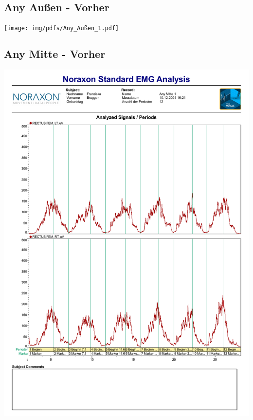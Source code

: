 





\subsection*{Any Außen - Vorher}
\texttt{[image: img/pdfs/Any\_Außen\_1.pdf]}
\clearpage

\subsection*{Any Mitte - Vorher}
\includegraphics[width=.9\textwidth]{img/pdfs/Any_Mitte_1.pdf}
\clearpage

